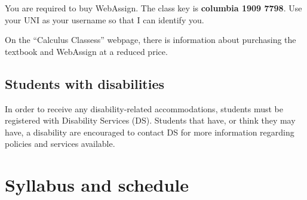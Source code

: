 \documentclass{article}
\begin{document}
You are required to buy WebAssign. The class key is \textbf{columbia 1909 7798}. Use your UNI as your username so that I can identify you. 

On the ``Calculus Classess'' webpage, there is information about purchasing the textbook and WebAssign at a reduced price. 

\subsection*{Students with disabilities}

In order to receive any disability-related accommodations, students must be registered with Disability Services (DS). Students that have, or think they may have, a disability are encouraged to contact DS for more information regarding policies and services available. 

\section*{Syllabus and schedule}
\end{document}
